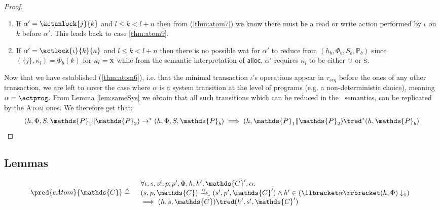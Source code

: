{\begin{proof}
\begin{enumerate}[label=({\roman*})]
	\item If $\alpha' = \actunlock{j}{k}$ and $l \leq k < l + n$ then from (\ref{thm:atom7}) we know there must be a \textsf{read} or \textsf{write} action performed by $\iota$ on $k$ before $\alpha'$. This leads back to case \ref{thm:atom9}.
	
	\item If $\alpha' = \actlock{\iota}{k}{\kappa}$ and $l \leq k < l + n$ then there is no possible wat for $\alpha'$ to reduce from $(h_b, \Phi_b, S_b, \mathds{P}_b)$ since $(\{j\}, \kappa_l) = \Phi_b(k)$ for $\kappa_l = \textsc{x}$ while from the semantic interpretation of $\mathsf{alloc}$, $\alpha'$ requires $\kappa_l$ to be either $\textsc{u}$ or $\textsc{s}$.
\end{enumerate}

Now that we have established (\ref{thm:atom6}), i.e. that the minimal transaction $\iota$'s operations appear in $\tau_{seq}$ before the ones of any other transaction, we are left to cover the case where $\alpha$ is a system transition at the level of programs (e.g. a non-deterministic choice), meaning $\alpha = \actprog$. From Lemma \ref{lem:sameSys} we obtain that all such transitions which can be reduced in the \tpl\ semantics, can be replicated by the \textsc{Atom} ones. We therefore get that:
\[
	(h, \Phi, S, \mathds{P}_1 \| \mathds{P}_2) \rightarrow^* (h, \Phi, S, \mathds{P}_b)
		\implies
	(h, \mathds{P}_1 \| \mathds{P}_2) \tred^* (h, \mathds{P}_b)
\]
\end{proof}
}

 \iffalse
\subsection{Lemmas}

\lem \label{lem:catom}
\[
\begin{array}{r l}
	\pred{cAtom}{\mathds{C}} \triangleq&
	\begin{array}{l}
	\forall \iota, s, s', p, p', \Phi, h, h', \mathds{C}', \alpha \ldotp \\
	(s, p, \mathds{C}) \xrightarrow{\alpha}_\iota (s', p', \mathds{C}') \land h' \in \left( \llbracket \alpha \rrbracket(h, \Phi) \downarrow_1 \right) \\
	\implies
	(h, s, \mathds{C}) \tred (h', s', \mathds{C}')
	\end{array}
\end{array}
\]

